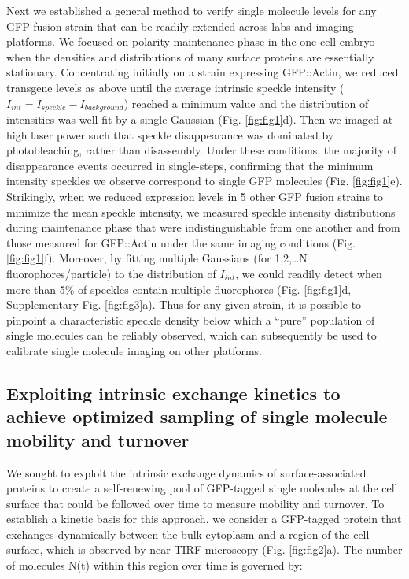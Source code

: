  Next we established a general method to verify single molecule levels for any GFP fusion strain that can be readily extended across labs and imaging platforms. We focused on polarity maintenance phase in the one-cell embryo when the densities and distributions of many surface proteins are essentially stationary. Concentrating initially on a strain expressing GFP::Actin, we reduced transgene levels as above until the average intrinsic speckle intensity ($I_{int} = I_{speckle} - I_{background}$) reached a minimum value and the distribution of intensities was well-fit by a single Gaussian (Fig. \ref{fig:fig1}d). Then we imaged at high laser power such that speckle disappearance was dominated by photobleaching, rather than disassembly. Under these conditions, the majority of disappearance events occurred in single-steps, confirming that the minimum intensity speckles we observe correspond to single GFP molecules (Fig. \ref{fig:fig1}e). Strikingly, when we reduced expression levels in 5 other GFP fusion strains to minimize the mean speckle intensity, we measured speckle intensity distributions during maintenance phase that were indistinguishable from one another and from those measured for GFP::Actin under the same imaging conditions (Fig. \ref{fig:fig1}f). Moreover, by fitting multiple Gaussians (for 1,2,…N fluorophores/particle) to the distribution of $I_{int}$, we could readily detect when more than 5\% of speckles contain multiple fluorophores (Fig. \ref{fig:fig1}d, Supplementary Fig. \ref{fig:fig3}a). Thus for any given strain, it is possible to pinpoint a characteristic speckle density below which a “pure” population of single molecules can be reliably observed, which can subsequently be used to calibrate single molecule imaging on other platforms. 
 
 \subsection{Exploiting intrinsic exchange kinetics to achieve optimized sampling of single molecule mobility and turnover}
 
 We sought to exploit the intrinsic exchange dynamics of surface-associated proteins to create a self-renewing pool of GFP-tagged single molecules at the cell surface that could be followed over time to measure mobility and turnover. To establish a kinetic basis for this approach, we consider a GFP-tagged protein that exchanges dynamically between the bulk cytoplasm and a region of the cell surface, which is observed by near-TIRF microscopy (Fig. \ref{fig:fig2}a). The number of molecules N(t) within this region over time is governed by:
 
